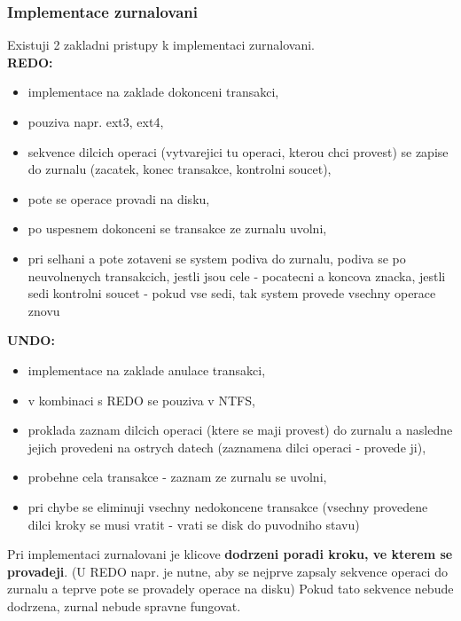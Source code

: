 \documentclass[a4paper, 11pt]{article}
\begin{document}
\subsubsection{Implementace zurnalovani}
Existuji 2 zakladni pristupy k implementaci zurnalovani. \\
\textbf{REDO:}
\begin{itemize}
    \item implementace na zaklade dokonceni transakci,
    \item pouziva napr. ext3, ext4,
    \item sekvence dilcich operaci (vytvarejici tu operaci, kterou chci provest) se zapise do zurnalu (zacatek, konec transakce, kontrolni soucet),
    \item pote se operace provadi na disku,
    \item po uspesnem dokonceni se transakce ze zurnalu uvolni,
    \item pri selhani a pote zotaveni se system podiva do zurnalu, podiva se po neuvolnenych transakcich, jestli jsou cele - pocatecni a koncova znacka, jestli sedi kontrolni soucet - pokud vse sedi, tak system provede vsechny operace znovu \\

\end{itemize}
\textbf{UNDO:}
\begin{itemize}
    \item implementace na zaklade anulace transakci,
    \item v kombinaci s REDO se pouziva v NTFS,
    \item proklada zaznam dilcich operaci (ktere se maji provest) do zurnalu a nasledne jejich provedeni na ostrych datech (zaznamena dilci operaci - provede ji),
    \item probehne cela transakce - zaznam ze zurnalu se uvolni,
    \item pri chybe se eliminuji vsechny nedokoncene transakce (vsechny provedene dilci kroky se musi vratit - vrati se disk do puvodniho stavu) \\
\end{itemize}

Pri implementaci zurnalovani je klicove \textbf{dodrzeni poradi kroku, ve kterem se provadeji}. (U REDO napr. je nutne, aby se nejprve zapsaly sekvence operaci do zurnalu a teprve pote se provadely operace na disku) Pokud tato sekvence nebude dodrzena, zurnal nebude spravne fungovat. \\

\newpage
\end{document}
